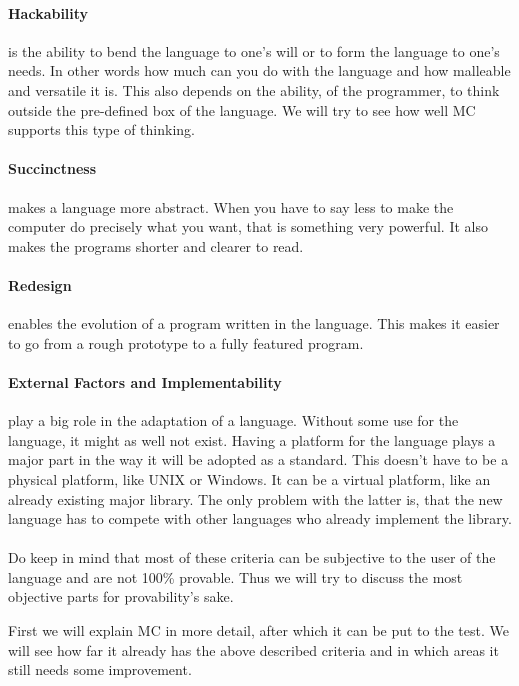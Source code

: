 \begin{multicols}{2}
   \paragraph{Hackability}
   is the ability to bend the language to one's will or to form the language to one's needs.
   In other words how much can you do with the language and how malleable and versatile it is.
   This also depends on the ability, of the programmer, to think outside the pre-defined box of the language.
   We will try to see how well MC supports this type of thinking.

   \paragraph{Succinctness}
   makes a language more abstract.
   When you have to say less to make the computer do precisely what you want, that is something very powerful.
   It also makes the programs shorter and clearer to read.

   \paragraph{Redesign}
   enables the evolution of a program written in the language.
   This makes it easier to go from a rough prototype to a fully featured program.

   \paragraph{External Factors and Implementability}
   play a big role in the adaptation of a language.
   Without some use for the language, it might as well not exist.
   Having a platform for the language plays a major part in the way it will be adopted as a standard.
   This doesn't have to be a physical platform, like UNIX or Windows.
   It can be a virtual platform, like an already existing major library.
   The only problem with the latter is, that the new language has to compete with other languages who already implement the library.

   \paragraph{}
   Do keep in mind that most of these criteria can be subjective to the user of the language and are not 100\% provable.
   Thus we will try to discuss the most objective parts for provability's sake.

   First we will explain MC in more detail, after which it can be put to the test.
   We will see how far it already has the above described criteria and in which areas it still needs some improvement.

\end{multicols}
